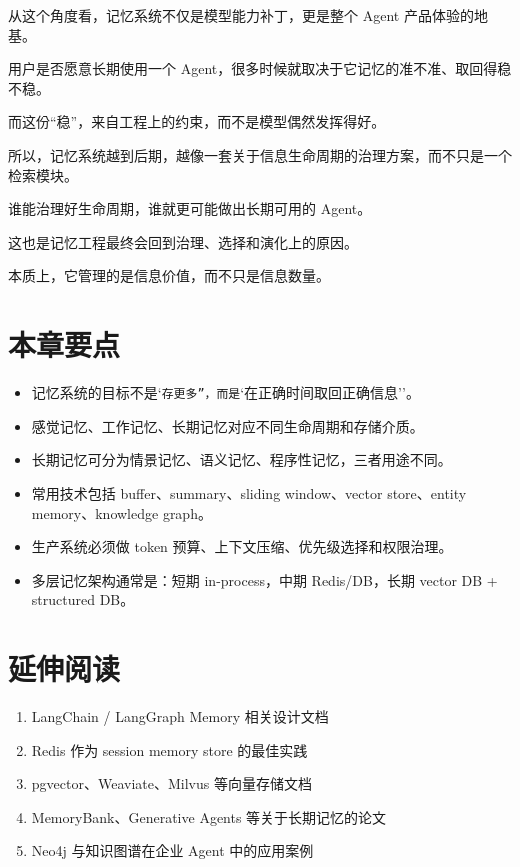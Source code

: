 从这个角度看，记忆系统不仅是模型能力补丁，更是整个 Agent 产品体验的地基。

用户是否愿意长期使用一个 Agent，很多时候就取决于它记忆的准不准、取回得稳不稳。

而这份``稳''，来自工程上的约束，而不是模型偶然发挥得好。

所以，记忆系统越到后期，越像一套关于信息生命周期的治理方案，而不只是一个检索模块。

谁能治理好生命周期，谁就更可能做出长期可用的 Agent。

这也是记忆工程最终会回到治理、选择和演化上的原因。

本质上，它管理的是信息价值，而不只是信息数量。


\section{本章要点}

\begin{itemize}[leftmargin=2em]
\item 记忆系统的目标不是`\texttt{存更多''，而是}`在正确时间取回正确信息''。
\item 感觉记忆、工作记忆、长期记忆对应不同生命周期和存储介质。
\item 长期记忆可分为情景记忆、语义记忆、程序性记忆，三者用途不同。
\item 常用技术包括 buffer、summary、sliding window、vector store、entity memory、knowledge graph。
\item 生产系统必须做 token 预算、上下文压缩、优先级选择和权限治理。
\item 多层记忆架构通常是：短期 in-process，中期 Redis/DB，长期 vector DB + structured DB。
\end{itemize}

\section{延伸阅读}

\begin{enumerate}[leftmargin=2em]
\item LangChain / LangGraph Memory 相关设计文档
\item Redis 作为 session memory store 的最佳实践
\item pgvector、Weaviate、Milvus 等向量存储文档
\item MemoryBank、Generative Agents 等关于长期记忆的论文
\item Neo4j 与知识图谱在企业 Agent 中的应用案例
\end{enumerate}
